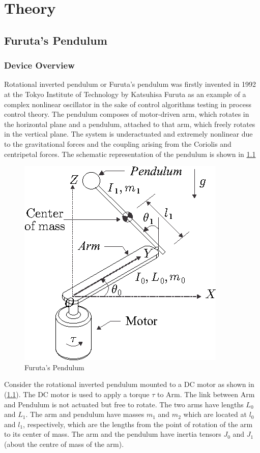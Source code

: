 \chapter{Theory}
\section{Furuta's Pendulum}
\subsection{Device Overview}
Rotational inverted pendulum or Furuta’s pendulum was firstly invented in 1992 at the Tokyo Institute of Technology by Katsuhisa Furuta as an example of a complex nonlinear oscillator in the sake of control algorithms testing in process control theory.
The pendulum composes of motor-driven arm, which rotates in the horizontal plane and a pendulum, attached to that arm, which freely rotates in the vertical plane. The system is underactuated and extremely nonlinear due to the gravitational forces and the coupling arising from the Coriolis and centripetal forces. The schematic representation of the pendulum is shown in \ref{furuta}
\begin{figure}[h]
	\centering
	\includegraphics[width=.55\linewidth]{images/furuta}
	\caption{Furuta's Pendulum}
	\label{furuta}
\end{figure}
\newpage
Consider the rotational inverted pendulum
mounted to a DC motor as shown in (\ref{furuta}). The DC motor
is used to apply a torque $\tau$ to Arm. The link between Arm and Pendulum is not actuated but free to rotate. The two arms have lengths $L_0$ and $L_1$. The arm and pendulum have masses $m_1$ and $m_2$ which are located at $l_0$ and $l_1$, respectively, which are the lengths from the point of rotation of the arm to its center of mass. The arm and the pendulum have inertia tensors $J_0$ and $J_1$ (about the centre of mass of the arm).

